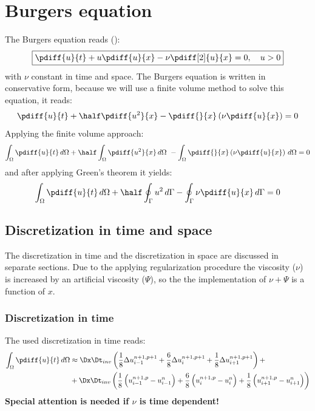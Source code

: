 
\chapter{Burgers equation}
The Burgers equation reads (\citet{Debnath2008}):
\begin{align}
\boxed{
\pdiff{u}{t} + u \pdiff{u}{x} - \nu \pdiff[2]{u}{x}= 0, \quad u >0
}
\end{align}
with $\nu$ constant in time and space.
The Burgers equation is written in conservative form, because we will use a finite volume method to solve this equation, it reads:
\begin{align}
    \pdiff{u}{t} + \half \pdiff{u^2}{x} - \pdiff{}{x} \left( \nu \pdiff{u}{x} \right) = 0
\end{align}
Applying the finite volume approach:
\begin{align}
    \int_\Omega \pdiff{u}{t}\, d\Omega + \half \int_\Omega \pdiff{u^2}{x}\, d\Omega \ - \int_\Omega  \pdiff{}{x} \left( \nu \pdiff{u}{x} \right)\, d\Omega = 0
\end{align}
and after applying Green's theorem it yields:
\begin{align}
    \int_\Omega \pdiff{u}{t}\, d\Omega + \half \oint_\Gamma u^2\, d\Gamma
    - \oint_\Gamma  \nu \pdiff{u}{x} \, d\Gamma = 0
\end{align}

\section{Discretization in time and space}
The discretization in time and the discretization in space are discussed in separate sections.
Due to the applying regularization procedure the viscosity ($\nu$) is increased by an artificial viscosity ($\Psi$), so the the implementation of $\nu + \Psi$ is a function of $x$.
\subsection{Discretization in time}
The used discretization in time reads:
\begin{align}
    \int_\Omega \pdiff{u}{t}\, d\Omega & \approx
    \Dx  \Dt_{inv}  \left(\frac{1}{8} \Delta u^{n+1,p+1}_{i-1} + \frac{6}{8} \Delta u^{n+1,p+1}_{i} + \frac{1}{8} \Delta u^{n+1,p+1}_{i+1}\right) +
    \nonumber \\*
    &+ \Dx \Dt_{inv} \left( \frac{1}{8}\left( u^{n+1,p}_{i-1} - u^{n}_{i-1} \right) + \frac{6}{8}\left( u^{n+1,p}_{i} - u^{n}_{i} \right) + \frac{1}{8}\left( u^{n+1,p}_{i+1} - u^{n}_{i+1} \right) \right)
\end{align}
\textbf{Special attention is needed if $\nu$ is time dependent!}
\newpage
